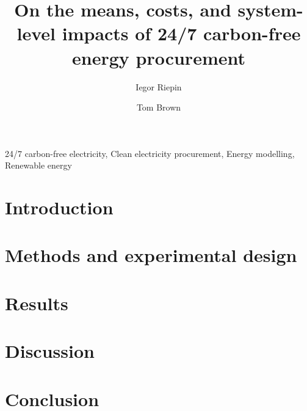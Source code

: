 \documentclass[11pt, 5p, nopreprintline]{elsarticle}
\begin{document}
\begin{frontmatter}

	\title{On the means, costs, and system-level impacts of 24/7 carbon-free energy procurement}

	\author[tubaddress]{Iegor Riepin}
	\author[tubaddress]{Tom Brown}

	\address[tubaddress]{Department of Digital Transformation in Energy Systems, TU Berlin, Germany}

	\begin{abstract}
		
	\end{abstract}

	\begin{keyword}
		24/7 carbon-free electricity,
		Clean electricity procurement,
		Energy modelling,
		Renewable energy
	\end{keyword}


\end{frontmatter}


\section{Introduction}
\label{sec:intro}


\section{Methods and experimental design}
\label{sec:methods}


\section{Results}
\label{sec:results}


\section{Discussion}
\label{sec:discussion}


\section{Conclusion}
\label{sec:conclusion}

\end{document}
